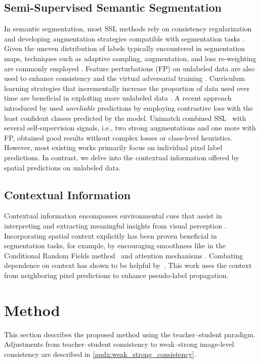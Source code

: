 \documentclass{article}
\renewcommand{\cite}[1]{\citep{#1}}
\begin{document}
\subsection{Semi-Supervised Semantic Segmentation}
In semantic segmentation, most SSL methods rely on consistency regularization and developing augmentation strategies compatible with segmentation tasks \cite{french2019semi,gct,cps,pc2seg,xu2022semisupervised}. Given the uneven distribution of labels typically encountered in segmentation maps, techniques such as adaptive sampling, augmentation, and loss re-weighting are commonly employed \cite{ael}. Feature perturbations (FP) on unlabeled data \cite{cct, pseudoseg, psmt, unimatch} are also used to enhance consistency and the virtual adversarial training \cite{psmt}. Curriculum learning strategies that incrementally increase the proportion of data used over time are beneficial in exploiting more unlabeled data \cite{st++, wang2022semi}. A recent approach introduced by \citet{wang2022semi} used \textit{unreliable} predictions by employing contrastive loss with the least confident classes predicted by the model. Unimatch \cite{unimatch} combined SSL~\citep{sohn2020fixmatch} with several self-supervision signals, i.e., two strong augmentations and one more with FP, obtained good results without complex losses or class-level heuristics.
 However, most existing works primarily focus on individual pixel label predictions. In contrast, we delve into the contextual information offered by spatial predictions on unlabeled data.

\subsection{Contextual Information}\label{sec:context}
Contextual information encompasses environmental cues that assist in interpreting and extracting meaningful insights from visual perception \cite{Toussaint1978TheUO,Elliman1990ARO}. Incorporating spatial context explicitly has been proven beneficial in segmentation tasks, for example, by encouraging smoothness like in the Conditional Random Fields  method~\cite{deeplab} and attention mechanisms \cite{vaswani2017attention,dosovitskiy2021image,wang2020eca}. Combating dependence on context has shown to be helpful by~\citet{nekrasov2021mix3d}. This work uses the context from neighboring pixel predictions to enhance pseudo-label propagation.  


 \section{Method}
This section describes the proposed method using the teacher--student paradigm. Adjustments from teacher--student consistency to weak--strong image-level consistency are described in \cref{apdx:weak_strong_consistency}.
\end{document}
